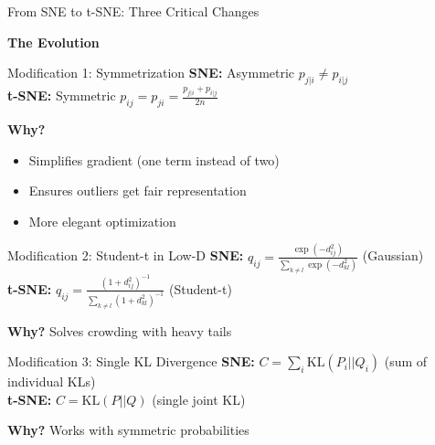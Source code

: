\documentclass[aspectratio=169]{beamer}
\begin{document}
\begin{frame}{From SNE to t-SNE: Three Critical Changes}
\vspace{-3mm}
\begin{center}
\Large\textbf{The Evolution}
\end{center}

\vspace{1mm}
\begin{block}{Modification 1: Symmetrization}
\textbf{SNE:} Asymmetric $p_{j|i} \neq p_{i|j}$\\
\textbf{t-SNE:} Symmetric $p_{ij} = p_{ji} = \frac{p_{j|i} + p_{i|j}}{2n}$

\vspace{1mm}
\textbf{Why?} 
\begin{itemize}
\item Simplifies gradient (one term instead of two)
\item Ensures outliers get fair representation
\item More elegant optimization
\end{itemize}
\end{block}

\begin{block}{Modification 2: Student-t in Low-D}
\textbf{SNE:} $q_{ij} = \frac{\exp(-d_{ij}^2)}{\sum_{k \neq l}\exp(-d_{kl}^2)}$ (Gaussian)\\
\textbf{t-SNE:} $q_{ij} = \frac{(1+d_{ij}^2)^{-1}}{\sum_{k \neq l}(1+d_{kl}^2)^{-1}}$ (Student-t)

\vspace{1mm}
\textbf{Why?} Solves crowding with heavy tails
\end{block}

\begin{block}{Modification 3: Single KL Divergence}
\textbf{SNE:} $C = \sum_i \text{KL}(P_i||Q_i)$ (sum of individual KLs)\\
\textbf{t-SNE:} $C = \text{KL}(P||Q)$ (single joint KL)

\vspace{1mm}
\textbf{Why?} Works with symmetric probabilities
\end{block}
\end{frame}
\end{document}
